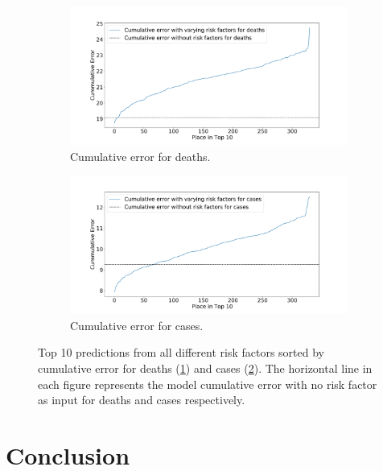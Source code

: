 \documentclass[a4paper, inpress]{jds} %
\renewcommand{\_}{%
    \textunderscore\hspace{0pt}%
}
\begin{document}
\begin{figure}[!htbp]
    \begin{subfigure}{.95\textwidth}
        \centering
        \includegraphics[width=1.0\textwidth]{images/predict/PlaceTop10_DeathNEW3.pdf}
        \caption{Cumulative error for deaths.}
        \label{fig:place-top10-death}
    \end{subfigure}
    \begin{subfigure}{.95\textwidth}
        \centering
        \includegraphics[width=1.0\textwidth]{images/predict/PlaceTop10_CasesNEW3.pdf}
        \caption{Cumulative error for cases.}
        \label{fig:place-top10-cases}
    \end{subfigure}

    \caption{Top 10 predictions from all different risk factors sorted by cumulative error for deaths (\ref{fig:place-top10-death}) and cases (\ref{fig:place-top10-cases}). The horizontal line in each figure represents the model cumulative error with no risk factor as input for deaths and cases respectively.}
    \label{fig:place-top10-both}
    
    
\end{figure}

\section{Conclusion}
\end{document}
